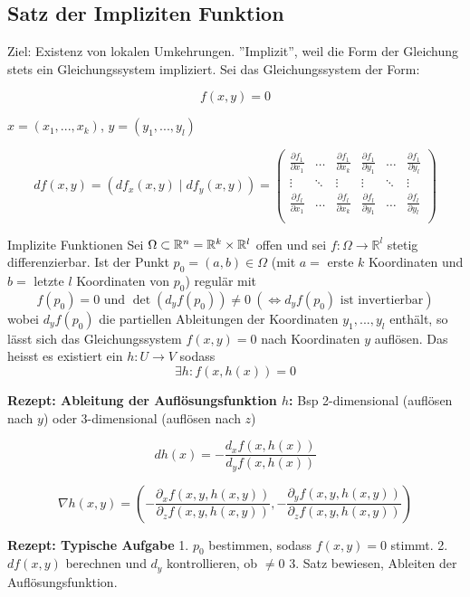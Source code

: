 
\subsection{Satz der Impliziten Funktion}

Ziel: Existenz von lokalen Umkehrungen. ''Implizit'', weil die Form der Gleichung stets ein Gleichungssystem impliziert. Sei das Gleichungssystem der Form:

\[
    f(x, y) = 0
\]

$x = (x_1, ..., x_k)$, $y = (y_1, ..., y_l)$

\[
    df(x, y) = (df_x(x, y) \mid df_y(x, y)) = 
        \begin{pmatrix}
            \frac{\partial f_1}{\partial x_1} & \hdots & \frac{\partial f_1}{\partial x_k}
            & \frac{\partial f_1}{\partial y_1} & \hdots & \frac{\partial f_1}{\partial y_l}\\
            
            \vdots & \ddots & \vdots & \vdots & \ddots & \vdots\\
            
            \frac{\partial f_l}{\partial x_1} & \hdots & \frac{\partial f_l}{\partial x_k}
            & \frac{\partial f_l}{\partial y_1} & \hdots & \frac{\partial f_l}{\partial y_l}\\
        \end{pmatrix}
\]

\begin{Satz}{Implizite Funktionen}{}
	Sei $\Omega \subset \mathbb{R}^n = \mathbb{R}^k \times \mathbb{R}^l$ offen und sei $f: \Omega \to \mathbb{R}^l$ stetig differenzierbar. Ist der Punkt $p_0 = (a, b) \in \Omega$ (mit $a=$ erste $k$ Koordinaten und $b=$ letzte $l$ Koordinaten von $p_0$) regulär mit
	\[
    	f(p_0) = 0 \text{ und } \det(d_y f(p_0)) \neq 0\ (\iff d_y f(p_0) \text{ ist invertierbar})
	\]
	wobei $d_yf(p_0)$ die partiellen Ableitungen der Koordinaten $y_1, ..., y_l$ enthält, so lässt sich das Gleichungssystem $f(x, y) = 0$ nach Koordinaten $y$ auflösen. Das heisst es existiert ein $h: U \to V$ sodass 
	\[
  		\exists h: f(x, h(x)) = 0
	\]
\end{Satz}

\textbf{Rezept: Ableitung der Auflösungsfunktion $h$:} Bsp 2-dimensional (auflösen nach $y$) oder 3-dimensional (auflösen nach $z$)

\[
    dh(x) = -\frac{d_x f(x, h(x))}{d_y f(x, h(x))}
\]


\[
    \nabla h(x, y) =
        \left(
            -\frac{\partial_x f(x, y, h(x, y))}{\partial_z f(x, y, h(x, y))},
            -\frac{\partial_y f(x, y, h(x, y))}{\partial_z f(x, y, h(x, y))}
        \right)
\]

\textbf{Rezept: Typische Aufgabe} 1. $p_0$ bestimmen, sodass $f(x, y)=0$ stimmt. 2. $df(x, y)$ berechnen und $d_y$ kontrollieren, ob $\neq 0$ 3. Satz bewiesen, Ableiten der Auflösungsfunktion.

